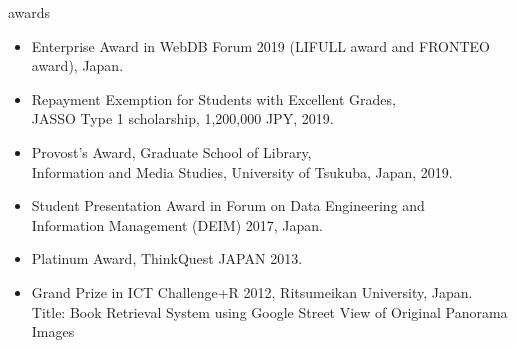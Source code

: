 \documentclass{resume} %
\begin{document}
\begin{rSection}{awards}
\begin{itemize}
  \item Enterprise Award in WebDB Forum 2019 (LIFULL award and FRONTEO award), Japan.
  \item Repayment Exemption for Students with Excellent Grades, \\JASSO Type 1 scholarship, 1,200,000 JPY, 2019.
  \item Provost’s Award, Graduate School of Library, \\Information and Media Studies, University of Tsukuba, Japan, 2019.
  \item Student Presentation Award in Forum on Data Engineering
  and \\Information Management (DEIM) 2017, Japan.
  \item Platinum Award, ThinkQuest JAPAN 2013. %
  \item Grand Prize in ICT Challenge+R 2012, Ritsumeikan University, Japan. \\Title: Book Retrieval System using Google Street View of Original Panorama Images
\end{itemize}

\end{rSection}


\end{document}
